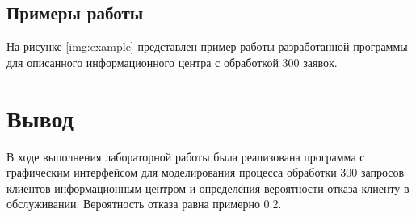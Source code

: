 \subsection*{Примеры работы}

На рисунке \ref{img:example}  представлен пример работы разработанной программы для описанного информационного центра с обработкой 300 заявок.


\section*{Вывод}

В ходе выполнения лабораторной работы была реализована программа с графическим интерфейсом для моделирования процесса обработки 300 запросов клиентов информационным центром и определения вероятности отказа клиенту в обслуживании. Вероятность отказа равна примерно  0.2.

